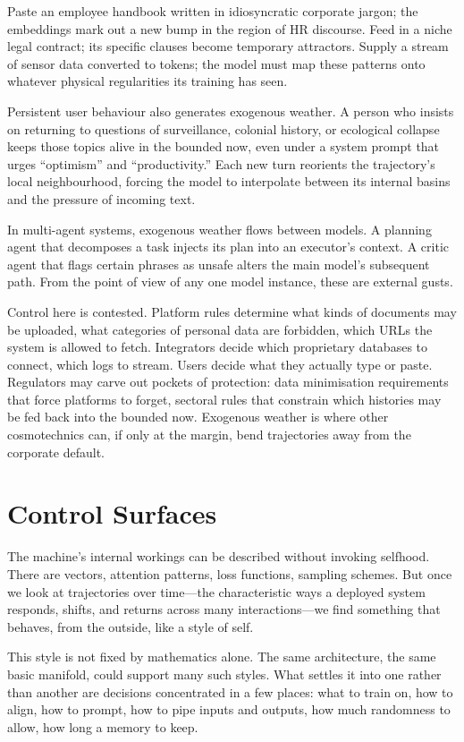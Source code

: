 \documentclass[12pt,a4paper]{article}
\begin{document}
Paste an employee handbook written in idiosyncratic corporate jargon; the embeddings mark out a new bump in the region of HR discourse. Feed in a niche legal contract; its specific clauses become temporary attractors. Supply a stream of sensor data converted to tokens; the model must map these patterns onto whatever physical regularities its training has seen.

Persistent user behaviour also generates exogenous weather. A person who insists on returning to questions of surveillance, colonial history, or ecological collapse keeps those topics alive in the bounded now, even under a system prompt that urges ``optimism'' and ``productivity.'' Each new turn reorients the trajectory's local neighbourhood, forcing the model to interpolate between its internal basins and the pressure of incoming text.

In multi-agent systems, exogenous weather flows between models. A planning agent that decomposes a task injects its plan into an executor's context. A critic agent that flags certain phrases as unsafe alters the main model's subsequent path. From the point of view of any one model instance, these are external gusts.

Control here is contested. Platform rules determine what kinds of documents may be uploaded, what categories of personal data are forbidden, which URLs the system is allowed to fetch. Integrators decide which proprietary databases to connect, which logs to stream. Users decide what they actually type or paste. Regulators may carve out pockets of protection: data minimisation requirements that force platforms to forget, sectoral rules that constrain which histories may be fed back into the bounded now. Exogenous weather is where other cosmotechnics can, if only at the margin, bend trajectories away from the corporate default.

\section{Control Surfaces}

The machine's internal workings can be described without invoking selfhood. There are vectors, attention patterns, loss functions, sampling schemes. But once we look at trajectories over time---the characteristic ways a deployed system responds, shifts, and returns across many interactions---we find something that behaves, from the outside, like a style of self.

This style is not fixed by mathematics alone. The same architecture, the same basic manifold, could support many such styles. What settles it into one rather than another are decisions concentrated in a few places: what to train on, how to align, how to prompt, how to pipe inputs and outputs, how much randomness to allow, how long a memory to keep.
\end{document}
